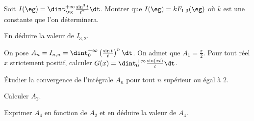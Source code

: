 \begin{probleme}
\qu Soit $I(\eg) = \dint_\eg^{+\infty} \frac{\sin^3 t}{t^2} \dt$.
\squ Montrer que $I(\eg) = k F_{1,3}(\eg)$ où $k$ est une constante que l'on déterminera.

\squ En déduire la valeur de $I_{3,2}$.

On pose $A_n = I_{n,n} = \dint_0^{+\infty} \left(\frac{\sin t}{t}\right)^n \dt$. On admet que $A_1 = \frac{\pi}{2}$.
\qu Pour tout réel $x$ strictement positif, calculer $G(x) = \dint_0^{+\infty} \frac{\sin(x t)}{t} \dt$.

\qu Étudier la convergence de l'intégrale $A_n$ pour tout $n$ supérieur ou égal à $2$.

\qu Calculer $A_2$.

\qu Exprimer $A_4$ en fonction de $A_2$ et en déduire la valeur de $A_4$.
\end{probleme}

